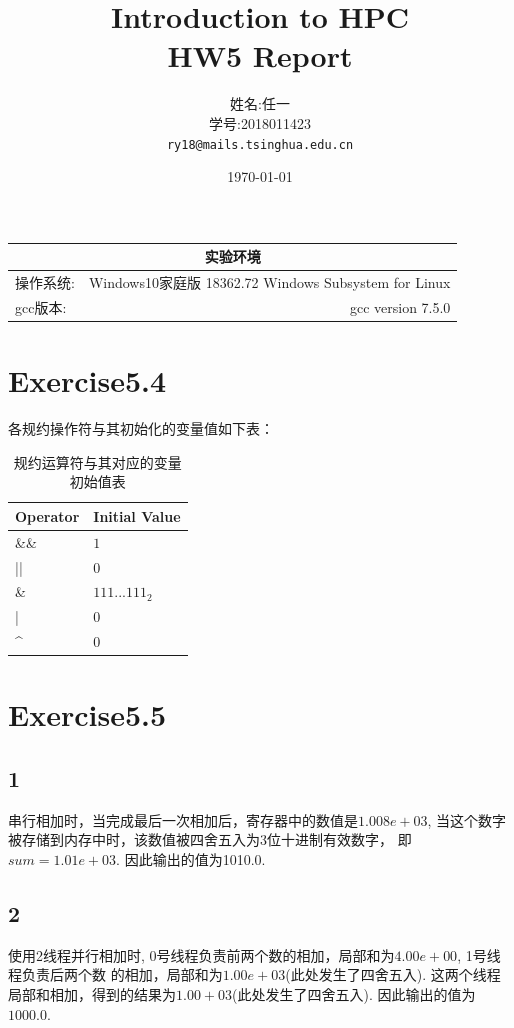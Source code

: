 \documentclass[UTF8]{article}
\title{Introduction to HPC \\ HW5 Report} %
\author{姓名:任一  \\学号:2018011423\\ \texttt{ry18@mails.tsinghua.edu.cn}} %
\date{\today} %
\begin{document}
\maketitle %
\begin{center}
    \begin{tabular}{l  r}
    \hline
        \multicolumn{2}{c}{实验环境} \\ \hline
        操作系统: & Windows10家庭版 18362.72 Windows Subsystem for Linux \\ \hline%
        gcc版本: & gcc version 7.5.0 \\ \hline%
    \end{tabular}
\end{center}
\newpage

\section{Exercise5.4}
各规约操作符与其初始化的变量值如下表：
\begin{table}[h]
    \label{tab:my-table}
    \centering
    \caption{规约运算符与其对应的变量初始值表}
    \begin{tabular}{|l|l|}
    \hline
    Operator           & Initial Value \\ \hline
    \&\&               & $1$             \\ \hline
    ||                 & $0$             \\ \hline
    \&                 & $111...111_2$     \\ \hline
    |                  & $0$             \\ \hline
    \textasciicircum{} & $0$             \\ \hline
    \end{tabular}
    \end{table}

\section{Exercise5.5}
\subsection{1}
串行相加时，当完成最后一次相加后，寄存器中的数值是$1.008e+03$, 
当这个数字被存储到内存中时，该数值被四舍五入为3位十进制有效数字，
即$sum = 1.01e+03$. 因此输出的值为1010.0.

\subsection{2}
使用2线程并行相加时,
0号线程负责前两个数的相加，局部和为$4.00e+00$, 1号线程负责后两个数
的相加，局部和为$1.00e+03$(此处发生了四舍五入). 
这两个线程局部和相加，得到的结果为$1.00+03$(此处发生了四舍五入).
因此输出的值为$1000.0$.
\end{document}

